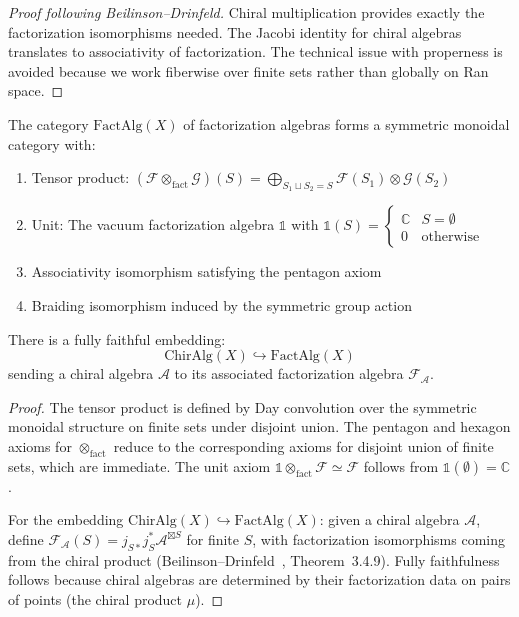 \begin{proof}[Proof following Beilinson--Drinfeld]
Chiral multiplication provides exactly the factorization isomorphisms needed.
The Jacobi identity for chiral algebras translates to associativity of factorization. The technical
issue with properness is avoided because we work fiberwise over finite sets rather than globally on Ran space.
\end{proof}


\begin{theorem}\label{thm:fact-monoidal-corrected}
The category $\text{FactAlg}(X)$ of factorization algebras forms a symmetric monoidal
category with:
\begin{enumerate}
\item Tensor product: $(\mathcal{F} \otimes_{\text{fact}} \mathcal{G})(S) = \bigoplus_{S_1 \sqcup S_2 = S} \mathcal{F}(S_1) \otimes \mathcal{G}(S_2)$
\item Unit: The vacuum factorization algebra $\mathbb{1}$ with $\mathbb{1}(S) = \begin{cases} \mathbb{C} & S = \emptyset \\ 0 & \text{otherwise} \end{cases}$
\item Associativity isomorphism satisfying the pentagon axiom
\item Braiding isomorphism induced by the symmetric group action
\end{enumerate}

There is a fully faithful embedding:
\[\text{ChirAlg}(X) \hookrightarrow \text{FactAlg}(X)\]
sending a chiral algebra $\mathcal{A}$ to its associated factorization algebra $\mathcal{F}_{\mathcal{A}}$.
\end{theorem}

\begin{proof}
The tensor product is defined by Day convolution over the symmetric monoidal structure on finite sets under disjoint union. The pentagon and hexagon axioms for $\otimes_{\mathrm{fact}}$ reduce to the corresponding axioms for disjoint union of finite sets, which are immediate. The unit axiom $\mathbb{1} \otimes_{\mathrm{fact}} \mathcal{F} \simeq \mathcal{F}$ follows from $\mathbb{1}(\emptyset) = \mathbb{C}$.

For the embedding $\mathrm{ChirAlg}(X) \hookrightarrow \mathrm{FactAlg}(X)$: given a chiral algebra $\mathcal{A}$, define $\mathcal{F}_{\mathcal{A}}(S) = j_{S*}j_S^*\mathcal{A}^{\boxtimes S}$ for finite $S$, with factorization isomorphisms coming from the chiral product (Beilinson--Drinfeld~\cite{BD04}, Theorem~3.4.9). Fully faithfulness follows because chiral algebras are determined by their factorization data on pairs of points (the chiral product $\mu$).
\end{proof}

